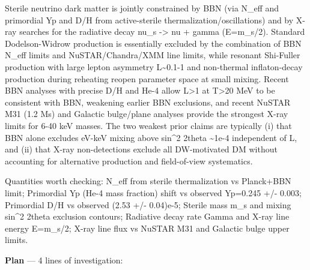 \documentclass[11pt,a4paper]{article}
\begin{document}
Sterile neutrino dark matter is jointly constrained by BBN (via N\_eff and primordial Yp and D/H from active-sterile thermalization/oscillations) and by X-ray searches for the radiative decay nu\_s -\textgreater{} nu + gamma (E=m\_s/2). Standard Dodelson-Widrow production is essentially excluded by the combination of BBN N\_eff limits and NuSTAR/Chandra/XMM line limits, while resonant Shi-Fuller production with large lepton asymmetry L\textasciitilde{}0.1-1 and non-thermal inflaton-decay production during reheating reopen parameter space at small mixing. Recent BBN analyses with precise D/H and He-4 allow L\textgreater{}1 at T\textgreater{}20 MeV to be consistent with BBN, weakening earlier BBN exclusions, and recent NuSTAR M31 (1.2 Ms) and Galactic bulge/plane analyses provide the strongest X-ray limits for 6-40 keV masses. The two weakest prior claims are typically (i) that BBN alone excludes eV-keV mixing above sin\textasciicircum{}2 2theta \textasciitilde{}1e-4 independent of L, and (ii) that X-ray non-detections exclude all DW-motivated DM without accounting for alternative production and field-of-view systematics.

Quantities worth checking: N\_eff from sterile thermalization vs Planck+BBN limit; Primordial Yp (He-4 mass fraction) shift vs observed Yp=0.245 +/- 0.003; Primordial D/H vs observed (2.53 +/- 0.04)e-5; Sterile mass m\_s and mixing sin\textasciicircum{}2 2theta exclusion contours; Radiative decay rate Gamma and X-ray line energy E=m\_s/2; X-ray line flux vs NuSTAR M31 and Galactic bulge upper limits.

\textbf{Plan} --- 4 lines of investigation:
\end{document}
